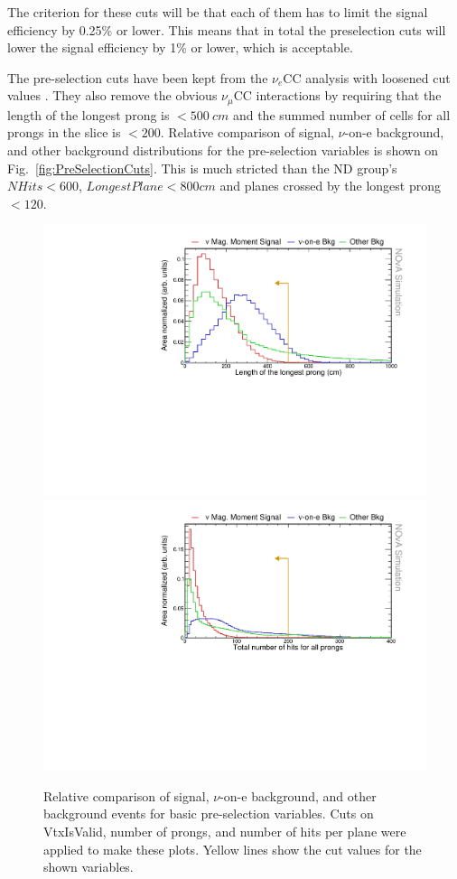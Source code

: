 The criterion for these cuts will be that each of them has to limit the signal efficiency by 0.25\% or lower. This means that in total the preselection cuts will lower the signal efficiency by 1\% or lower, which is acceptable.

The pre-selection cuts have been kept from the $\nu_e$\gls{CC} analysis with loosened cut values .
They also remove the obvious $\nu_\mu$CC interactions by requiring that the length of the longest prong is $<500\ \unit{cm}$ and the summed number of cells for all prongs in the slice is $<200$. Relative comparison of signal, $\nu$-on-e background, and other background distributions for the pre-selection variables is shown on Fig.~\ref{fig:PreSelectionCuts}. This is much stricted than the ND group's $NHits<600$, $LongestPlane<800\unit{cm}$ and planes crossed by the longest prong $<120$.


\begin{figure}[hbtp]
\centering
\includegraphics[width=.9\textwidth]{Plots/NuMMEventSelection/N1Cut_longestProng.pdf}
\includegraphics[width=.9\textwidth]{Plots/NuMMEventSelection/N1Cut_NHits.pdf}
\caption{Relative comparison of signal, $\nu$-on-e background, and other background events for basic pre-selection variables. Cuts on VtxIsValid, number of prongs, and number of hits per plane were applied to make these plots. Yellow lines show the cut values for the shown variables.}
\label{fig:PreSelectionCuts1}
\end{figure}

